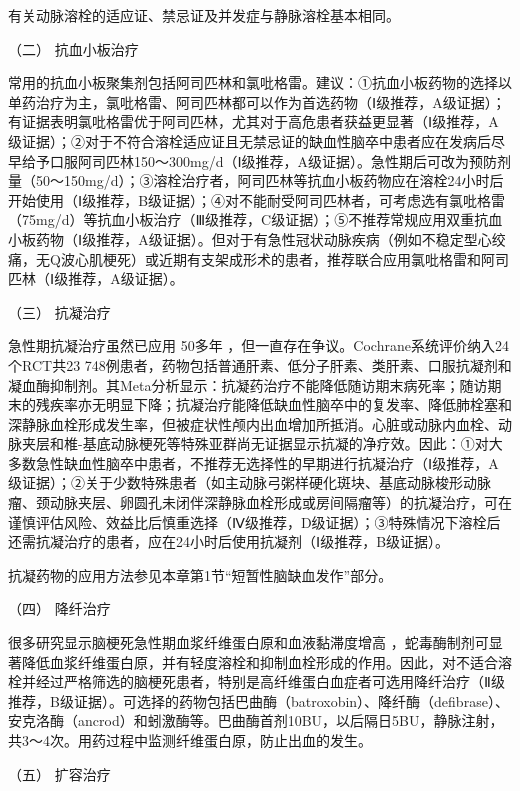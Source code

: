 有关动脉溶栓的适应证、禁忌证及并发症与静脉溶栓基本相同。

\hypertarget{text00242.htmlux5cux23CHP8-1-2-3-4-2}{}
（二） 抗血小板治疗

常用的抗血小板聚集剂包括阿司匹林和氯吡格雷。建议：①抗血小板药物的选择以单药治疗为主，氯吡格雷、阿司匹林都可以作为首选药物（Ⅰ级推荐，A级证据）；有证据表明氯吡格雷优于阿司匹林，尤其对于高危患者获益更显著（Ⅰ级推荐，A级证据）；②对于不符合溶栓适应证且无禁忌证的缺血性脑卒中患者应在发病后尽早给予口服阿司匹林150～300mg/d（Ⅰ级推荐，A级证据）。急性期后可改为预防剂量（50～150mg/d）；③溶栓治疗者，阿司匹林等抗血小板药物应在溶栓24小时后开始使用（Ⅰ级推荐，B级证据）；④对不能耐受阿司匹林者，可考虑选有氯吡格雷（75mg/d）等抗血小板治疗（Ⅲ级推荐，C级证据）；⑤不推荐常规应用双重抗血小板药物（Ⅰ级推荐，A级证据）。但对于有急性冠状动脉疾病（例如不稳定型心绞痛，无Q波心肌梗死）或近期有支架成形术的患者，推荐联合应用氯吡格雷和阿司匹林（Ⅰ级推荐，A级证据）。

\hypertarget{text00242.htmlux5cux23CHP8-1-2-3-4-3}{}
（三） 抗凝治疗

急性期抗凝治疗虽然已应用 50多年
，但一直存在争议。Cochrane系统评价纳入24个RCT共23
748例患者，药物包括普通肝素、低分子肝素、类肝素、口服抗凝剂和凝血酶抑制剂。其Meta分析显示：抗凝药治疗不能降低随访期末病死率；随访期末的残疾率亦无明显下降；抗凝治疗能降低缺血性脑卒中的复发率、降低肺栓塞和深静脉血栓形成发生率，但被症状性颅内出血增加所抵消。心脏或动脉内血栓、动脉夹层和椎-基底动脉梗死等特殊亚群尚无证据显示抗凝的净疗效。因此：①对大多数急性缺血性脑卒中患者，不推荐无选择性的早期进行抗凝治疗（Ⅰ级推荐，A级证据）；②关于少数特殊患者（如主动脉弓粥样硬化斑块、基底动脉梭形动脉瘤、颈动脉夹层、卵圆孔未闭伴深静脉血栓形成或房间隔瘤等）的抗凝治疗，可在谨慎评估风险、效益比后慎重选择（Ⅳ级推荐，D级证据）；③特殊情况下溶栓后还需抗凝治疗的患者，应在24小时后使用抗凝剂（Ⅰ级推荐，B级证据）。

抗凝药物的应用方法参见本章第1节“短暂性脑缺血发作”部分。

\hypertarget{text00242.htmlux5cux23CHP8-1-2-3-4-4}{}
（四） 降纤治疗

很多研究显示脑梗死急性期血浆纤维蛋白原和血液黏滞度增高
，蛇毒酶制剂可显著降低血浆纤维蛋白原，并有轻度溶栓和抑制血栓形成的作用。因此，对不适合溶栓并经过严格筛选的脑梗死患者，特别是高纤维蛋白血症者可选用降纤治疗（Ⅱ级推荐，B级证据）。可选择的药物包括巴曲酶（batroxobin）、降纤酶（defibrase）、安克洛酶（ancrod）和蚓激酶等。巴曲酶首剂10BU，以后隔日5BU，静脉注射，共3～4次。用药过程中监测纤维蛋白原，防止出血的发生。

\hypertarget{text00242.htmlux5cux23CHP8-1-2-3-4-5}{}
（五） 扩容治疗

